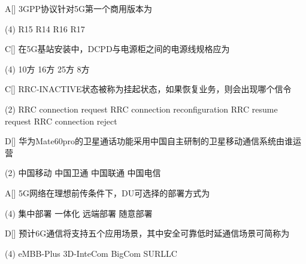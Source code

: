 \begin{choice}{A}[]
    3GPP协议针对5G第一个商用版本为
    \begin{tasks}(4)
        \task R15
        \task R14
        \task R16
        \task R17
    \end{tasks}
\end{choice}


\begin{choice}{C}[]
    在5G基站安装中，DCPD与电源柜之间的电源线规格应为
    \begin{tasks}(4)
        \task 10方
        \task 16方
        \task 25方
        \task 8方
    \end{tasks}
\end{choice}


\begin{choice}{C}[]
    RRC-INACTIVE状态被称为挂起状态，如果恢复业务，则会出现哪个信令
    \begin{tasks}(2)
        \task RRC connection request
        \task RRC connection reconfiguration
        \task RRC resume request
        \task RRC connection reject
    \end{tasks}
\end{choice}



\begin{choice}{D}[]
    华为Mate60pro的卫星通话功能采用中国自主研制的卫星移动通信系统由谁运营
    \begin{tasks}(2)
        \task 中国移动
        \task 中国卫通
        \task 中国联通
        \task 中国电信
    \end{tasks}
\end{choice}




\begin{choice}{A}[]
    5G网络在理想前传条件下，DU可选择的部署方式为
    \begin{tasks}(4)
        \task 集中部署
        \task 一体化
        \task 远端部署
        \task 随意部署
    \end{tasks}
\end{choice}

\begin{choice}{D}[]
    预计6G通信将支持五个应用场景，其中安全可靠低时延通信场景可简称为
    \begin{tasks}(4)
        \task eMBB-Plus
        \task 3D-InteCom
        \task BigCom
        \task SURLLC
    \end{tasks}
\end{choice}

